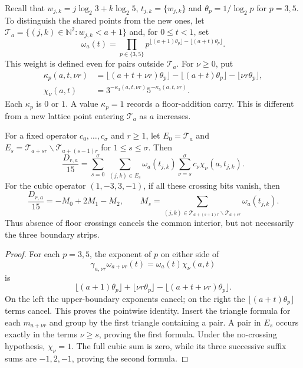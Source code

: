 Recall that
$w_{j,k}=j\log_2 3+k\log_2 5$, $t_{j,k}=\{w_{j,k}\}$ and
$\theta_p=1/\log_2 p$ for $p=3,5$.
To distinguish the shared points from the new ones, let
$\mathcal T_a=\{(j,k)\in\mathbb N^2:w_{j,k}<a+1\}$ and, for $0\le t<1$, set
\[
 \omega_a(t)=\prod_{p\in\{3,5\}}
 p^{\lfloor(a+1)\theta_p\rfloor-\lfloor(a+t)\theta_p\rfloor}.
\]
This weight is defined even for pairs outside $\mathcal T_a$.  For $\nu\ge0$, put
\[
 \begin{split}
 \kappa_p(a,t,\nu r)
 &=\lfloor(a+t+\nu r)\theta_p\rfloor
   -\lfloor(a+t)\theta_p\rfloor-\lfloor\nu r\theta_p\rfloor,\\
 \chi_\nu(a,t)&=3^{-\kappa_3(a,t,\nu r)}5^{-\kappa_5(a,t,\nu r)}.
 \end{split}
\]
Each $\kappa_p$ is $0$ or $1$.  A value $\kappa_p=1$ records a floor-addition carry.  This is different
from a new lattice point entering $\mathcal T_a$ as $a$ increases.

\begin{proposition}
\label{long269:res:strip-decomposition}
For a fixed operator $c_0,\ldots,c_\sigma$ and $r\ge1$, let
$E_0=\mathcal T_a$ and $E_s=\mathcal T_{a+sr}\smallsetminus \mathcal T_{a+(s-1)r}$ for $1\le s\le\sigma$.
Then
\[
 \frac{D_{r,a}}{15}=
 \sum_{s=0}^{\sigma}\ \sum_{(j,k)\in E_s}
 \omega_a(t_{j,k})\sum_{\nu=s}^{\sigma}c_\nu\chi_\nu(a,t_{j,k}).
\]
For the cubic operator $(1,-3,3,-1)$, if all these crossing bits vanish,
then
\[
 \frac{D_{r,a}}{15}=-M_0+2M_1-M_2,\qquad
 M_s=\sum_{(j,k)\in \mathcal T_{a+(s+1)r}\smallsetminus \mathcal T_{a+sr}}\omega_a(t_{j,k}).
\]
Thus absence of floor crossings cancels the common interior, but not
necessarily the three boundary strips.
\end{proposition}
\begin{proof}
For each $p=3,5$, the exponent of $p$ on either side of
\[
 \gamma_{a,\nu r}\omega_{a+\nu r}(t)
   =\omega_a(t)\chi_\nu(a,t)
\]
is
\[
 \lfloor(a+1)\theta_p\rfloor+\lfloor\nu r\theta_p\rfloor
 -\lfloor(a+t+\nu r)\theta_p\rfloor.
\]
On the left the upper-boundary exponents cancel; on the right the
$\lfloor(a+t)\theta_p\rfloor$ terms cancel.  This proves the pointwise
identity.
Insert the triangle formula for each $m_{a+\nu r}$ and group by the first
triangle containing a pair.  A pair in $E_s$ occurs exactly in the terms
$\nu\ge s$, proving the first formula.  Under the no-crossing hypothesis,
$\chi_\nu=1$.  The full cubic sum is zero, while its three successive suffix
sums are $-1,2,-1$, proving the second formula.
\end{proof}

